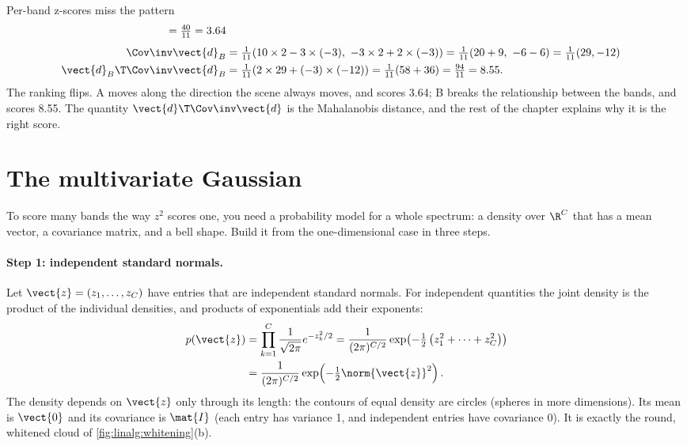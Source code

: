 \begin{worked}[label={we:rx:zfail}]{Per-band z-scores miss the pattern}
\begin{align*}
  = \tfrac{40}{11} = 3.64\\[4pt]
\Cov\inv\vect{d}_B &= \tfrac{1}{11}(10\times2 - 3\times(-3),\ -3\times2 + 2\times(-3))
  = \tfrac{1}{11}(20 + 9,\ -6 - 6) = \tfrac{1}{11}(29, -12)\\
\vect{d}_B\T\Cov\inv\vect{d}_B &= \tfrac{1}{11}(2\times29 + (-3)\times(-12)) = \tfrac{1}{11}(58 + 36)
  = \tfrac{94}{11} = 8.55 .
\end{align*}
The ranking flips. A moves along the direction the scene always moves, and scores 3.64; B breaks the
relationship between the bands, and scores 8.55. The quantity $\vect{d}\T\Cov\inv\vect{d}$ is the
Mahalanobis distance, and the rest of the chapter explains why it is the right score.
\end{worked}

\section{The multivariate Gaussian}\label{sec:rx:mvn}

To score many bands the way $z^2$ scores one, you need a probability model for a whole spectrum: a
density over $\R^C$ that has a mean vector, a covariance matrix, and a bell shape. Build it from the
one-dimensional case in three steps.

\paragraph{Step 1: independent standard normals.} Let $\vect{z} = (z_1, \dots, z_C)$ have entries
that are independent standard normals. For independent quantities the joint density is the product
of the individual densities, and products of exponentials add their exponents:
\begin{align}
p(\vect{z}) &= \prod_{k=1}^{C}\frac{1}{\sqrt{2\pi}}e^{-z_k^2/2}
  = \frac{1}{(2\pi)^{C/2}}\exp\!\left(-\tfrac12\left(z_1^2 + \cdots + z_C^2\right)\right) \notag\\
&= \frac{1}{(2\pi)^{C/2}}\exp\!\left(-\tfrac12\norm{\vect{z}}^2\right). \label{eq:rx:stdmvn}
\end{align}
The density depends on $\vect{z}$ only through its length: the contours of equal density are
circles (spheres in more dimensions). Its mean is $\vect{0}$ and its covariance is $\mat{I}$ (each
entry has variance 1, and independent entries have covariance 0). It is exactly the round, whitened
cloud of \cref{fig:linalg:whitening}(b).


